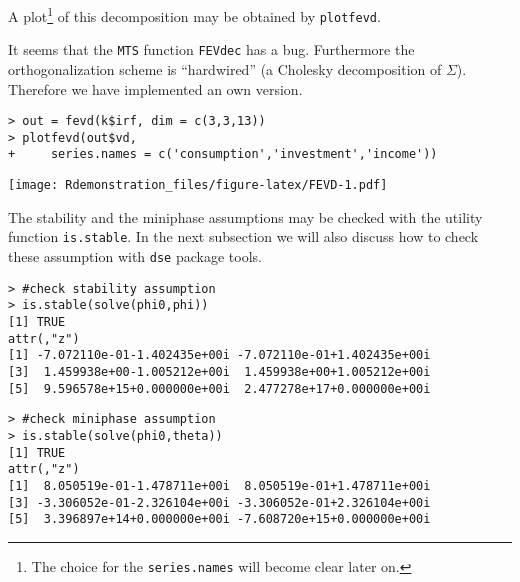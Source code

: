 \documentclass[]{article}
\let\rmarkdownfootnote\footnote%
\def\footnote{\protect\rmarkdownfootnote}
\begin{document}
A plot\footnote{The choice for the \texttt{series.names} will become
  clear later on.} of this decomposition may be obtained by
\texttt{plotfevd}.

It seems that the \texttt{MTS} function \texttt{FEVdec} has a bug.
Furthermore the orthogonalization scheme is ``hardwired'' (a Cholesky
decomposition of \(\Sigma\)). Therefore we have implemented an own
version.

\begin{verbatim}
> out = fevd(k$irf, dim = c(3,3,13))
> plotfevd(out$vd, 
+     series.names = c('consumption','investment','income'))
\end{verbatim}

\texttt{[image: Rdemonstration\_files/figure-latex/FEVD-1.pdf]}

The stability and the miniphase assumptions may be checked with the
utility function \texttt{is.stable}. In the next subsection we will also
discuss how to check these assumption with \texttt{dse} package tools.

\begin{verbatim}
> #check stability assumption
> is.stable(solve(phi0,phi))
[1] TRUE
attr(,"z")
[1] -7.072110e-01-1.402435e+00i -7.072110e-01+1.402435e+00i
[3]  1.459938e+00-1.005212e+00i  1.459938e+00+1.005212e+00i
[5]  9.596578e+15+0.000000e+00i  2.477278e+17+0.000000e+00i
\end{verbatim}

\begin{verbatim}
> #check miniphase assumption
> is.stable(solve(phi0,theta))
[1] TRUE
attr(,"z")
[1]  8.050519e-01-1.478711e+00i  8.050519e-01+1.478711e+00i
[3] -3.306052e-01-2.326104e+00i -3.306052e-01+2.326104e+00i
[5]  3.396897e+14+0.000000e+00i -7.608720e+15+0.000000e+00i
\end{verbatim}
\end{document}
